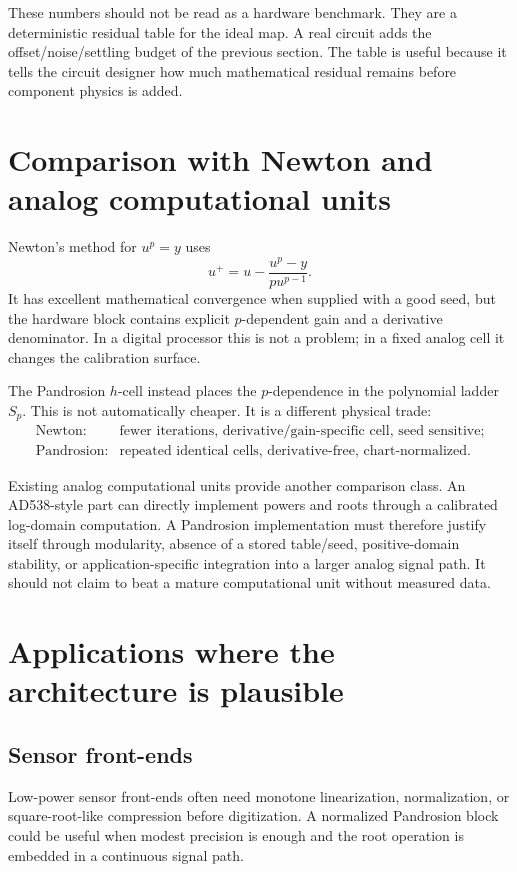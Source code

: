 \documentclass[11pt]{article}
\begin{document}
These numbers should not be read as a hardware benchmark.  They are a
deterministic residual table for the ideal map.  A real circuit adds the
offset/noise/settling budget of the previous section.  The table is useful
because it tells the circuit designer how much mathematical residual remains
before component physics is added.

\section{Comparison with Newton and analog computational units}

Newton's method for \(u^p=y\) uses
\[
        u^+=u-\frac{u^p-y}{p u^{p-1}}.
\]
It has excellent mathematical convergence when supplied with a good seed, but
the hardware block contains explicit \(p\)-dependent gain and a derivative
denominator.  In a digital processor this is not a problem; in a fixed analog
cell it changes the calibration surface.

The Pandrosion \(h\)-cell instead places the \(p\)-dependence in the polynomial
ladder \(S_p\).  This is not automatically cheaper.  It is a different
physical trade:
\[
\begin{array}{ll}
\text{Newton:} & \text{fewer iterations, derivative/gain-specific cell, seed sensitive;}\\
\text{Pandrosion:} & \text{repeated identical cells, derivative-free, chart-normalized.}
\end{array}
\]

Existing analog computational units provide another comparison class.  An
AD538-style part can directly implement powers and roots through a calibrated
log-domain computation.  A Pandrosion implementation must therefore justify
itself through modularity, absence of a stored table/seed, positive-domain
stability, or application-specific integration into a larger analog signal
path.  It should not claim to beat a mature computational unit without
measured data.

\section{Applications where the architecture is plausible}

\subsection{Sensor front-ends}

Low-power sensor front-ends often need monotone linearization, normalization,
or square-root-like compression before digitization.  A normalized
Pandrosion block could be useful when modest precision is enough and the root
operation is embedded in a continuous signal path.
\end{document}
